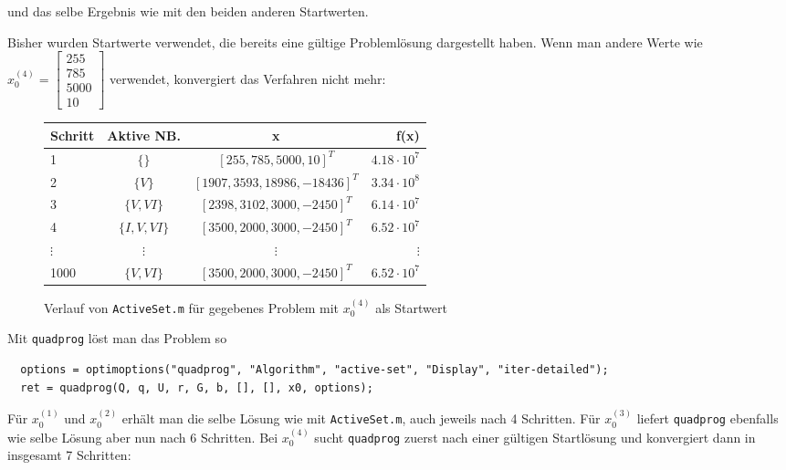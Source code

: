 \documentclass[a4paper, 12pt]{report}
\begin{document}
und das selbe Ergebnis wie mit den beiden anderen Startwerten.\par

Bisher wurden Startwerte verwendet, die bereits eine gültige Problemlösung dargestellt haben. Wenn man
andere Werte wie $x_0^{(4)} = \begin{bmatrix}255\\785\\5000\\10\end{bmatrix}$ verwendet, konvergiert
das Verfahren nicht mehr:

\begin{figure}[H]
  \centering
  \def\arraystretch{1.25}
  \begin{tabular}{l|c|c|r}
    \hline
    \textbf{Schritt} & \textbf{Aktive NB.} & \textbf{x} & \textbf{f(x)}\\
    \hline
    1 & $\{\}$ & $[255, 785, 5000, 10]^T$ & $4.18 \cdot 10^7$\\
    2 & $\{V\}$ & $[1907, 3593, 18986, -18436]^T$ & $3.34 \cdot 10^8$\\
    3 & $\{V, VI\}$ & $[2398, 3102, 3000, -2450]^T$ & $6.14 \cdot 10^7$\\
    4 & $\{I, V, VI\}$ & $[3500, 2000, 3000, -2450]^T$ & $6.52 \cdot 10^7$\\
    $\vdots$ & $\vdots$ & $\vdots$ & $\vdots$\\
    1000 & $\{V, VI\}$ & $[3500, 2000, 3000, -2450]^T$ & $6.52 \cdot 10^7$\\
    \hline
  \end{tabular}
  \caption{Verlauf von \lstinline[basicstyle=\ttfamily\color{black}]|ActiveSet.m| für gegebenes Problem mit $x_0^{(4)}$ als Startwert}
\end{figure}

Mit \lstinline[basicstyle=\ttfamily\color{black}]|quadprog| löst man das Problem so

\begin{lstlisting}
  options = optimoptions("quadprog", "Algorithm", "active-set", "Display", "iter-detailed");
  ret = quadprog(Q, q, U, r, G, b, [], [], x0, options);\end{lstlisting}

Für $x_0^{(1)}$ und $x_0^{(2)}$ erhält man die selbe Lösung wie mit \lstinline[basicstyle=\ttfamily\color{black}]|ActiveSet.m|, auch
jeweils nach 4 Schritten. Für $x_0^{(3)}$ liefert \lstinline[basicstyle=\ttfamily\color{black}]|quadprog| ebenfalls wie selbe
Lösung aber nun nach 6 Schritten. Bei $x_0^{(4)}$ sucht \lstinline[basicstyle=\ttfamily\color{black}]|quadprog| zuerst nach
einer gültigen Startlösung und konvergiert dann in insgesamt 7 Schritten:
\end{document}
